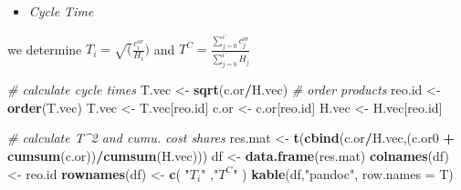 \documentclass[
]{article}
\newenvironment{Shaded}{\begin{snugshade}}{\end{snugshade}}
\newcommand{\CommentTok}[1]{\textcolor[rgb]{0.56,0.35,0.01}{\textit{#1}}}
\newcommand{\DataTypeTok}[1]{\textcolor[rgb]{0.13,0.29,0.53}{#1}}
\newcommand{\KeywordTok}[1]{\textcolor[rgb]{0.13,0.29,0.53}{\textbf{#1}}}
\newcommand{\NormalTok}[1]{#1}
\newcommand{\OperatorTok}[1]{\textcolor[rgb]{0.81,0.36,0.00}{\textbf{#1}}}
\newcommand{\StringTok}[1]{\textcolor[rgb]{0.31,0.60,0.02}{#1}}
\providecommand{\tightlist}{%
  \setlength{\itemsep}{0pt}\setlength{\parskip}{0pt}}
\begin{document}
\begin{itemize}
\tightlist
\item
  \emph{Cycle Time}
\end{itemize}

we determine \(T_i=\sqrt (\frac {c_i^{or}}{H_i})\) and
\(T^C=\frac {\sum_{j=0}^{i´} c_j^{or}}{\sum_{j=0}^{i´}H_j}\)

\begin{Shaded}
\begin{Highlighting}[]
\CommentTok{# calculate cycle times}
\NormalTok{T.vec <-}\StringTok{ }\KeywordTok{sqrt}\NormalTok{(c.or}\OperatorTok{/}\NormalTok{H.vec)}
\CommentTok{# order products}
\NormalTok{reo.id <-}\StringTok{ }\KeywordTok{order}\NormalTok{(T.vec)}
\NormalTok{T.vec <-}\StringTok{ }\NormalTok{T.vec[reo.id]}
\NormalTok{c.or <-}\StringTok{ }\NormalTok{c.or[reo.id]}
\NormalTok{H.vec <-}\StringTok{ }\NormalTok{H.vec[reo.id]}
\end{Highlighting}
\end{Shaded}

\begin{Shaded}
\begin{Highlighting}[]
\CommentTok{# calculate T^2 and cumu. cost shares}
\NormalTok{res.mat <-}\StringTok{ }\KeywordTok{t}\NormalTok{(}\KeywordTok{cbind}\NormalTok{(c.or}\OperatorTok{/}\NormalTok{H.vec,(c.or0 }\OperatorTok{+}\StringTok{ }\KeywordTok{cumsum}\NormalTok{(c.or))}\OperatorTok{/}\KeywordTok{cumsum}\NormalTok{(H.vec)))}
\NormalTok{df <-}\StringTok{ }\KeywordTok{data.frame}\NormalTok{(res.mat)}
\KeywordTok{colnames}\NormalTok{(df) <-}\StringTok{ }\NormalTok{reo.id }
\KeywordTok{rownames}\NormalTok{(df) <-}\StringTok{ }\KeywordTok{c}\NormalTok{(  }\StringTok{"$T_i$"}\NormalTok{ ,}\StringTok{"$T^C$"}\NormalTok{  )}
\KeywordTok{kable}\NormalTok{(df,}\StringTok{"pandoc"}\NormalTok{, }\DataTypeTok{row.names =}\NormalTok{ T)}
\end{Highlighting}
\end{Shaded}
\end{document}
